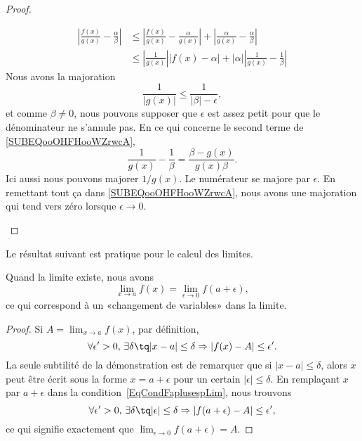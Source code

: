 \begin{proof}
\begin{subproof}
\begin{subequations}
\begin{align}
                | \frac{ f(x) }{ g(x) }-\frac{ \alpha }{ \beta } |&\leq | \frac{ f(x) }{ g(x) }-\frac{ \alpha }{ g(x) } |+| \frac{ \alpha }{ g(x) }-\frac{ \alpha }{ \beta } |\\
                &\leq | \frac{1}{ g(x) } | |f(x)-\alpha |+| \alpha | |\frac{1}{ g(x) }-\frac{1}{ \beta } |  \label{SUBEQooOHFHooWZrwcA}
            \end{align}
        \end{subequations}
        Nous avons la majoration
        \begin{equation}
            \frac{1}{ | g(x) | }\leq \frac{1}{ | \beta |-\epsilon },
        \end{equation}
        et comme \( \beta\neq 0\), nous pouvons supposer que \( \epsilon\) est assez petit pour que le dénominateur ne s'annule pas. En ce qui concerne le second terme de \eqref{SUBEQooOHFHooWZrwcA},
        \begin{equation}
            \frac{1}{ g(x) }-\frac{1}{ \beta }=\frac{ \beta-g(x) }{ g(x)\beta }.
        \end{equation}
        Ici aussi nous pouvons majorer \( 1/g(x)\). Le numérateur se majore par \( \epsilon\). En remettant tout ça dans \eqref{SUBEQooOHFHooWZrwcA}, nous avons une majoration qui tend vers zéro lorsque \( \epsilon\to 0\).
    \end{subproof}
\end{proof}

Le résultat suivant est pratique pour le calcul des limites.
\begin{proposition}     \label{PropChmVarLim}
	Quand la limite existe, nous avons
	\[
		\lim_{x\to a}f(x)=\lim_{\epsilon\to 0}f(a+\epsilon),
	\]
	ce qui correspond à un «changement de variables» dans la limite.
\end{proposition}

\begin{proof}
	Si \( A=\lim_{x\to a}f(x)\), par définition,
	\begin{equation}        \label{EqCondFaplusespLim}
		\forall\epsilon'>0,\,\exists\delta \tq | x-a |\leq\delta\Rightarrow| f(x)-A |\leq\epsilon'.
	\end{equation}
	La seule subtilité de la démonstration est de remarquer que si \( | x-a |\leq\delta\), alors \( x\) peut être écrit sous la forme \( x=a+\epsilon\) pour un certain \( | \epsilon |\leq\delta\). En remplaçant \( x\) par \( a+\epsilon\) dans la condition~\ref{EqCondFaplusespLim}, nous trouvons
	\begin{equation}
		\forall\epsilon'>0,\,\exists\delta \tq | \epsilon |\leq\delta\Rightarrow| f(a+\epsilon)-A |\leq\epsilon',
	\end{equation}
	ce qui signifie exactement que \( \lim_{\epsilon\to 0}f(a+\epsilon)=A\).
\end{proof}

